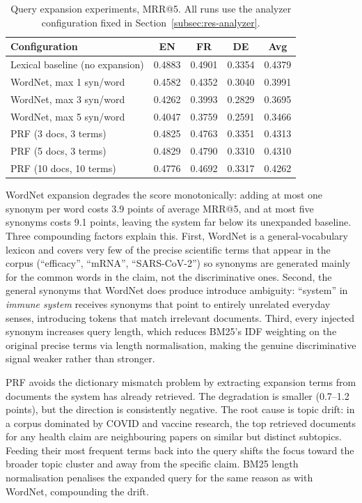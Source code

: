 \begin{table}[!ht]
    \caption{Query expansion experiments, MRR@5. All runs use the analyzer configuration fixed in Section~\ref{subsec:res-analyzer}.}
    \label{tab:expansion}
    \centering
    \begin{tabular}{lcccc}
        \toprule
        Configuration & EN & FR & DE & Avg \\
        \midrule
        Lexical baseline (no expansion)         & 0.4883 & 0.4901 & 0.3354 & 0.4379 \\
        \midrule
        WordNet, max 1 syn/word                  & 0.4582 & 0.4352 & 0.3040 & 0.3991 \\
        WordNet, max 3 syn/word                  & 0.4262 & 0.3993 & 0.2829 & 0.3695 \\
        WordNet, max 5 syn/word                  & 0.4047 & 0.3759 & 0.2591 & 0.3466 \\
        \midrule
        PRF (3 docs, 3 terms)                    & 0.4825 & 0.4763 & 0.3351 & 0.4313 \\
        PRF (5 docs, 3 terms)                    & 0.4829 & 0.4790 & 0.3310 & 0.4310 \\
        PRF (10 docs, 10 terms)                  & 0.4776 & 0.4692 & 0.3317 & 0.4262 \\
        \bottomrule
    \end{tabular}
\end{table}

WordNet expansion degrades the score monotonically: adding at most one synonym per word costs 3.9 points of average MRR@5, and at most five synonyms costs 9.1 points, leaving the system far below its unexpanded baseline. Three compounding factors explain this. First, WordNet is a general-vocabulary lexicon and covers very few of the precise scientific terms that appear in the corpus (``efficacy'', ``mRNA'', ``SARS-CoV-2'') so synonyms are generated mainly for the common words in the claim, not the discriminative ones. Second, the general synonyms that WordNet does produce introduce ambiguity: ``system'' in \textit{immune system} receives synonyms that point to entirely unrelated everyday senses, introducing tokens that match irrelevant documents. Third, every injected synonym increases query length, which reduces BM25's IDF weighting on the original precise terms via length normalisation, making the genuine discriminative signal weaker rather than stronger.

PRF avoids the dictionary mismatch problem by extracting expansion terms from documents the system has already retrieved. The degradation is smaller (0.7--1.2 points), but the direction is consistently negative. The root cause is topic drift: in a corpus dominated by COVID and vaccine research, the top retrieved documents for any health claim are neighbouring papers on similar but distinct subtopics. Feeding their most frequent terms back into the query shifts the focus toward the broader topic cluster and away from the specific claim. BM25 length normalisation penalises the expanded query for the same reason as with WordNet, compounding the drift.

